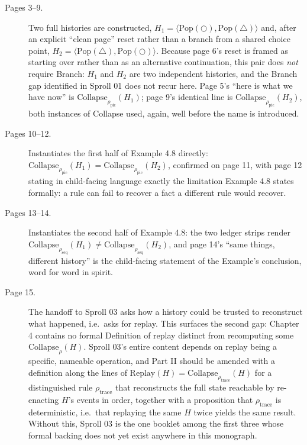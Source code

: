 \documentclass[11pt,twoside]{book}
\begin{document}
\begin{description}
\item[Pages 3--9.] Two full histories are constructed, $H_1 = \langle \mathrm{Pop}(\bigcirc), \mathrm{Pop}(\triangle) \rangle$ and, after an explicit ``clean page'' reset rather than a branch from a shared choice point, $H_2 = \langle \mathrm{Pop}(\triangle), \mathrm{Pop}(\bigcirc) \rangle$. Because page 6's reset is framed as starting over rather than as an alternative continuation, this pair does \emph{not} require Branch: $H_1$ and $H_2$ are two independent histories, and the Branch gap identified in Sproll 01 does not recur here. Page 5's ``here is what we have now'' is $\mathrm{Collapse}_{\rho_{\mathrm{pic}}}(H_1)$; page 9's identical line is $\mathrm{Collapse}_{\rho_{\mathrm{pic}}}(H_2)$, both instances of Collapse used, again, well before the name is introduced.
\item[Pages 10--12.] Instantiates the first half of Example 4.8 directly: $\mathrm{Collapse}_{\rho_{\mathrm{pic}}}(H_1) = \mathrm{Collapse}_{\rho_{\mathrm{pic}}}(H_2)$, confirmed on page 11, with page 12 stating in child-facing language exactly the limitation Example 4.8 states formally: a rule can fail to recover a fact a different rule would recover.
\item[Pages 13--14.] Instantiates the second half of Example 4.8: the two ledger strips render $\mathrm{Collapse}_{\rho_{\mathrm{seq}}}(H_1) \neq \mathrm{Collapse}_{\rho_{\mathrm{seq}}}(H_2)$, and page 14's ``same things, different history'' is the child-facing statement of the Example's conclusion, word for word in spirit.
\item[Page 15.] The handoff to Sproll 03 asks how a history could be trusted to reconstruct what happened, i.e.\ asks for replay. This surfaces the second gap: Chapter 4 contains no formal Definition of replay distinct from recomputing some $\mathrm{Collapse}_\rho(H)$. Sproll 03's entire content depends on replay being a specific, nameable operation, and Part II should be amended with a definition along the lines of $\mathrm{Replay}(H) = \mathrm{Collapse}_{\rho_{\mathrm{trace}}}(H)$ for a distinguished rule $\rho_{\mathrm{trace}}$ that reconstructs the full state reachable by re-enacting $H$'s events in order, together with a proposition that $\rho_{\mathrm{trace}}$ is deterministic, i.e.\ that replaying the same $H$ twice yields the same result. Without this, Sproll 03 is the one booklet among the first three whose formal backing does not yet exist anywhere in this monograph.
\end{description}
\end{document}
